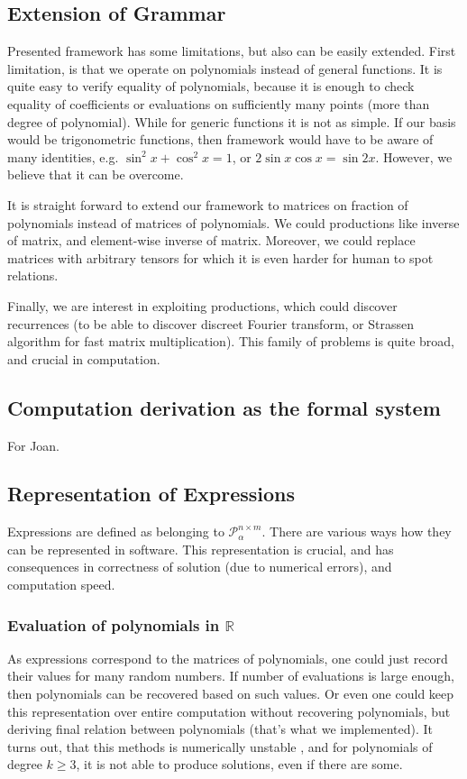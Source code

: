 \subsection{Extension of Grammar}
Presented framework has some limitations, but also can be easily extended. First limitation,
is that we operate on polynomials instead of general functions. It is quite easy to verify
equality of polynomials, because it is enough to check equality of coefficients or
evaluations on sufficiently many points (more than degree of polynomial). While for generic functions
it is not as simple. If our basis would be trigonometric functions, then 
framework would have to be aware of many identities, e.g. $\sin^2{x} + \cos^2{x} = 1$, or $2\sin x \cos x = \sin 2x$.
However, we believe that it can be overcome. 

It is straight forward to extend our framework to matrices on fraction of polynomials instead of matrices of polynomials.
We could productions like inverse of matrix, and element-wise inverse of matrix. 
Moreover, we could replace matrices with arbitrary tensors for which 
it is even harder for human to spot relations.


Finally, we are interest in exploiting productions, which could discover 
recurrences (to be able to discover discreet Fourier transform, or
Strassen algorithm for fast matrix multiplication). This family of problems is quite broad,
and crucial in computation.

\subsection{Computation derivation as the formal system}

For Joan.

\subsection{Representation of Expressions}

Expressions are defined as belonging to $\mathcal{P}^{n \times m}_\alpha$. There are various
ways how they can be represented in software. This representation is crucial, and has consequences in
 correctness of solution (due to numerical errors), and computation speed.

\subsubsection{Evaluation of polynomials in $\mathbb{R}$}
As expressions correspond to the matrices of polynomials, one could just record their values
for many random numbers. If number of evaluations is large enough, then polynomials can be
recovered based on such values. Or even one could keep this representation over entire 
computation without recovering polynomials, but deriving final relation between polynomials (that's what we implemented).
It turns out, that this methods is numerically unstable
, and for polynomials of degree $k \geq 3$, it is not able to produce solutions, even if there are some.

